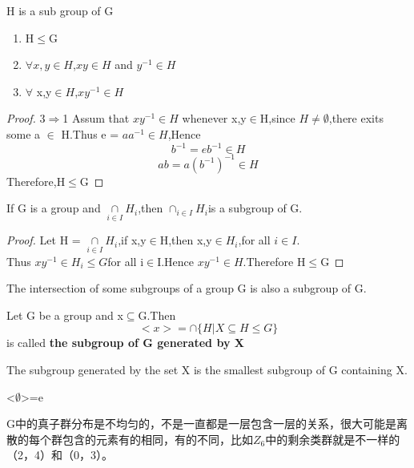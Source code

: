\documentclass[cn,10pt,math=newtx,citestyle=gb7714-2015,bibstyle=gb7714-2015]{elegantbook}
\begin{document}
\begin{theorem}
    H is a sub group of G
    \begin{enumerate}
        \item H$\leq$G
        \item $\forall x,y\in H$,$xy\in H$ and $y^{-1}\in H$
        \item $\forall$ x,y$\in H$,$xy^{-1}\in H$
    \end{enumerate}
\end{theorem}

\begin{proof}
    3$\Rightarrow$1
    Assum that $xy^{-1}\in H$ whenever x,y$\in$H,since $H\neq \emptyset$,there exits some a $\in$ H.Thus e = $aa^{-1}\in H$,Hence 
    \begin{equation*}
        b^{-1}=eb^{-1}\in H
    \end{equation*}
    \begin{equation*}
        ab = a(b^{-1})^{-1}\in H
    \end{equation*}
    Therefore,H$\leq$G
\end{proof}

\newpage

\begin{theorem}
    If G is a group and $\underset{i\in I}{\cap}H_i$,then $\cap_{i\in I}H_i$is a subgroup of G.
\end{theorem}

\begin{proof}
    Let H = $\underset{i\in I}{\cap}H_i$,if x,y$\in$H,then x,y$\in H_i$,for all $i\in I$.\\Thus $xy^{-1}\in H_i \leq G$for all i$\in$I.Hence $xy^{-1}\in H$.Therefore H$\leq$G
\end{proof}

\begin{note}
    The intersection of some subgroups of a group G is also a subgroup of G.
\end{note}

\begin{definition}
    Let G be a group and x$\subseteq$G.Then\begin{equation*}
        <x>=\cap \{H|X\subseteq H \leq G\}
    \end{equation*}
    is called \textbf{the subgroup of G generated by X}
\end{definition}
\begin{note}
    The subgroup generated by the set X is the smallest subgroup of G containing X.
\end{note}
\begin{note}
    <$\emptyset$>={e}
\end{note}
\begin{note}
    G中的真子群分布是不均匀的，不是一直都是一层包含一层的关系，很大可能是离散的每个群包含的元素有的相同，有的不同，比如$Z_6$中的剩余类群就是不一样的（2，4）和（0，3）。
\end{note}
\end{document}
